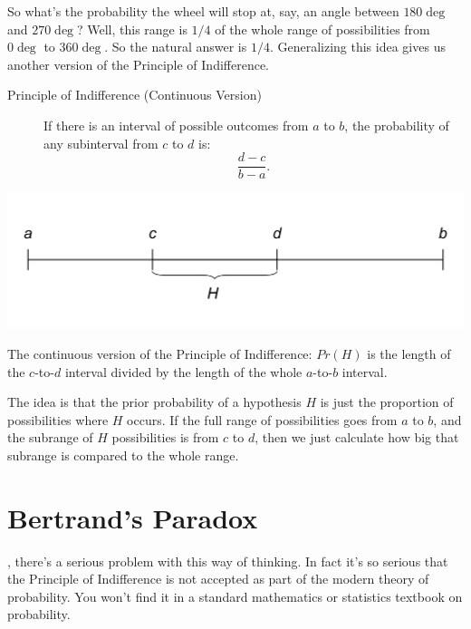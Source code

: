 \documentclass[justified]{tufte-book}
\theoremstyle{definition}
\theoremstyle{definition}
\theoremstyle{definition}
\theoremstyle{remark}
\begin{document}
So what's the probability the wheel will stop at, say, an angle between \(180\deg\) and \(270\deg\)? Well, this range is \(1/4\) of the whole range of possibilities from \(0\deg\) to \(360\deg\). So the natural answer is \(1/4\). Generalizing this idea gives us another version of the Principle of Indifference.

\begin{description}
\item[Principle of Indifference (Continuous Version)]
If there is an interval of possible outcomes from \(a\) to \(b\), the probability of any subinterval from \(c\) to \(d\) is: \[\frac{d-c}{b-a}.\]
\end{description}

\begin{marginfigure}
\includegraphics{_main_files/figure-latex/unnamed-chunk-136-1} \caption[The continuous version of the Principle of Indifference]{The continuous version of the Principle of Indifference: $Pr(H)$ is the length of the $c$-to-$d$ interval divided by the length of the whole $a$-to-$b$ interval.}\label{fig:unnamed-chunk-136}
\end{marginfigure}

The idea is that the prior probability of a hypothesis \(H\) is just the proportion of possibilities where \(H\) occurs. If the full range of possibilities goes from \(a\) to \(b\), and the subrange of \(H\) possibilities is from \(c\) to \(d\), then we just calculate how big that subrange is compared to the whole range.

\hypertarget{bertrands-paradox}{%
\section{Bertrand's Paradox}\label{bertrands-paradox}}

, there's a serious problem with this way of thinking. In fact it's so serious that the Principle of Indifference is not accepted as part of the modern theory of probability. You won't find it in a standard mathematics or statistics textbook on probability.
\end{document}
